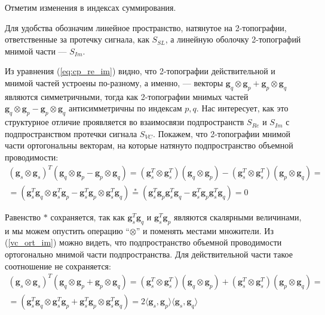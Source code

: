 Отметим изменения в индексах суммирования.

Для удобства обозначим линейное пространство, натянутое на 2-топографии, ответственные за протечку сигнала, как
$S_{SL}$, а линейную оболочку 2-топографий мнимой части --- $S_{Im}$.

Из уравнения (\ref{eq:cp_re_im}) видно, что 2-топографии действительной и мнимой частей устроены по-разному,
а именно, --- векторы $\mathbf{g}_q \otimes \mathbf{g}_p + \mathbf{g}_p \otimes \mathbf{g}_q$
являются симметричными, тогда как 2-топографии мнимых частей
$\mathbf{g}_q \otimes \mathbf{g}_p - \mathbf{g}_p \otimes \mathbf{g}_q$ антисимметричны по индексам $p, q$.
Нас интересует, как это структурное отличие проявляется во взаимосвязи подпространств $S_{Re}$ и $S_{Im}$ с
подпространством протечки сигнала $S_{VC}$.
Покажем, что  2-топографии мнимой части ортогональны векторам, на которые натянуто подпространство объемной проводимости:
\begin{gather}
    (\mathbf{g}_s \otimes \mathbf{g}_s)^T(\mathbf{g}_q \otimes \mathbf{g}_p - \mathbf{g}_p \otimes \mathbf{g}_q) =
        (\mathbf{g}_s^T \otimes \mathbf{g}_s^T)(\mathbf{g}_q \otimes \mathbf{g}_p) -
        (\mathbf{g}_s^T \otimes \mathbf{g}_s^T)(\mathbf{g}_p \otimes \mathbf{g}_q) = \nonumber \\
       =(\mathbf{g}_s^T \mathbf{g}_q \otimes \mathbf{g}_s^T \mathbf{g}_p -
         \mathbf{g}_s^T \mathbf{g}_p \otimes \mathbf{g}_s^T \mathbf{g}_q) \stackrel{*}{=}
        (\mathbf{g}_s^T \mathbf{g}_p \mathbf{g}_s^T \mathbf{g}_q -
         \mathbf{g}_s^T \mathbf{g}_p \mathbf{g}_s^T \mathbf{g}_q) = 0
         \label{eq:vc_ort_im}
\end{gather}

Равенство $*$ сохраняется, так как $\mathbf{g}^T_s \mathbf{g}_q$ и $\mathbf{g}_s^T \mathbf{g}_p$ являются скалярными величинами,
и мы можем опустить операцию ``$\otimes$'' и поменять местами множители.
Из (\ref{vc_ort_im}) можно видеть,
что подпространство объемной проводимости ортогонально мнимой части подпространства.
Для действительной части такое соотношение не сохраняется:
\begin{gather}
    (\mathbf{g}_s \otimes \mathbf{g}_s)^T(\mathbf{g}_q \otimes \mathbf{g}_p + \mathbf{g}_p \otimes \mathbf{g}_q) =
        (\mathbf{g}_s^T \otimes \mathbf{g}_s^T)(\mathbf{g}_q \otimes \mathbf{g}_p) +
        (\mathbf{g}_s^T \otimes \mathbf{g}_s^T)(\mathbf{g}_p \otimes \mathbf{g}_q) = \nonumber \\
       =(\mathbf{g}_s^T \mathbf{g}_q \otimes \mathbf{g}_s^T \mathbf{g}_p +
         \mathbf{g}_s^T \mathbf{g}_p \otimes \mathbf{g}_s^T \mathbf{g}_q) =
        2\langle\mathbf{g}_s, \mathbf{g}_p\rangle \langle\mathbf{g}_s, \mathbf{g}_q\rangle
         \label{eq:vc_ort_re}
\end{gather}

